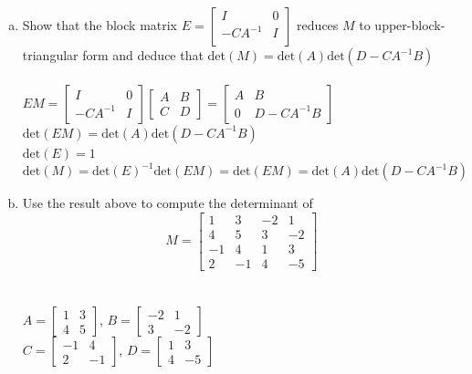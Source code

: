 \documentclass{article}
\begin{document}
{{\begin{enumerate}
\begin{enumerate}[a.]
\item Show that the block matrix $E=\left[
\begin{array}{cc}
I & 0\\
-CA^{-1} & I\\
\end{array}\right]$
reduces $M$ to upper-block-triangular form and deduce that det$(M)=\textrm{det}(A)\textrm{det}(D-CA^{-1}B)$
\\
\\$EM=\left[\begin{array}{cc}I & 0\\-CA^{-1} & I\end{array}\right]\left[\begin{array}{cc}A & B\\C & D\end{array}\right]=\left[\begin{array}{cc}A & B\\0 & D-CA^{-1}B\end{array}\right]$
\\$\textrm{det}(EM)=\textrm{det}(A)\textrm{det}(D-CA^{-1}B)$
\\$\textrm{det}(E)=1$
\\$\textrm{det}(M)=\textrm{det}(E)^{-1}\textrm{det}(EM)=\textrm{det}(EM)=\textrm{det}(A)\textrm{det}(D-CA^{-1}B)$
\\
\item Use the result above to compute the determinant of
$$M= \left[
\begin{array}{cccc}
1 & 3 & -2 & 1 \\
4 & 5 & 3 & -2 \\
-1 & 4 & 1 & 3 \\
2 & -1 & 4 & -5
\end{array}
\right]$$
\\
\\$A=\left[\begin{array}{cc}1 & 3\\4 & 5\end{array}\right]$, $B=\left[\begin{array}{cc}-2 & 1\\3 & -2\end{array}\right]$
\\$C=\left[\begin{array}{cc}-1 & 4\\2 & -1\end{array}\right]$, $D=\left[\begin{array}{cc}1 & 3\\4 & -5\end{array}\right]$

\end{enumerate}
\end{enumerate}}}
\end{document}

